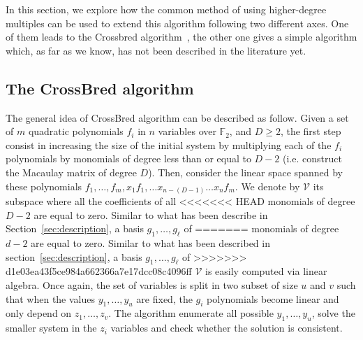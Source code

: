 \documentclass[a4paper,UKenglish,cleveref, autoref]{lipics-v2019}
\begin{document}
In this section, we explore how the common method of using higher-degree multiples can be used to extend this algorithm following two different axes.
%
One of them leads to the \textsf{Crossbred} algorithm~\cite{JouxV17}, the other
one gives a simple algorithm which, as far as we know, has not been described
in the literature yet.


\subsection{The \textsf{CrossBred} algorithm}

The general idea of \textsf{CrossBred} algorithm can be described as follow.
Given a set of $m$ quadratic polynomials $f_i$ in $n$ variables over $\mathbb{F}_2$, 
and $D \geq 2$, the first step consist in
increasing the size of the initial system by multiplying each of the $f_i$
polynomials by monomials of degree less than or equal to $D-2$ 
(i.e. construct the Macaulay matrix of degree $D$).
Then, consider the linear space spanned 
by these polynomials $f_1, \dots, f_m, x_1f_1, \dots x_{n-(D-1)}\dots x_{n}f_m$. 
We denote by $\mathcal{V}$ its subspace where all the coefficients of all 
<<<<<<< HEAD
monomials of degree $D -2$ are equal to zero. Similar to what has been 
describe in Section~\ref{sec:description}, a basis $g_1, \dots, g_\ell$ of
=======
monomials of degree $d -2$ are equal to zero. Similar to what has been 
described in section~\ref{sec:description}, a basis $g_1, \dots, g_\ell$ of
>>>>>>> d1e03ea43f5ce984a662366a7e17dcc08c4096ff
$\mathcal{V}$ is easily computed via linear algebra. Once again, the set of variables
is split in two subset of size $u$ and $v$ such that when the values $y_1, \dots, y_u$
are fixed, the $g_i$ polynomials become linear and only depend on $z_1, \dots, z_v$.
The algorithm enumerate all possible $y_1, \dots, y_u$, solve the smaller system in the $z_i$
variables and check whether the solution is consistent.
\end{document}
